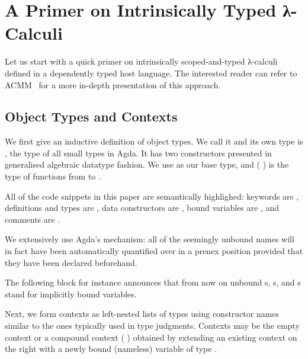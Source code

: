 \section{A Primer on Intrinsically Typed λ-Calculi}\label{sec:intrinsictyping}

Let us start with a quick primer on intrinsically scoped-and-typed λ-calculi
defined in a dependently typed host language. The interested reader
can refer to ACMM~\cite{DBLP:conf/cpp/Allais0MM17} for a more in-depth
presentation of this approach.

\subsection{Object Types and Contexts}

We first give an inductive definition of object types.
We call it  and its own type is ,
the type of all small types in Agda.
It has two constructors presented in generalised algebraic
datatype fashion.
We use  as our base type,
and (  ) is the type of functions from
 to .


\begin{remark}
  All of the code snippets in this paper are semantically highlighed:
  keywords are , definitions and types are ,
  data constructors are , bound variables are
  , and comments are .
\end{remark}

\begin{remark}
  We extensively use Agda's  mechanism: all of
  the seemingly unbound names will in fact have been automatically
  quantified over in a prenex position provided that they
  have been declared beforehand.
\end{remark}

The following block for instance announces that from now
on unbound s, s, and s stand for implicitly bound
 variables.


Next, we form contexts as left-nested lists of types using
constructor names similar to the ones typically used in
type judgments.
Contexts may be the empty context 
or a compound context ( \AIC{,} ) obtained
by extending an existing context  on the right
with a newly bound (nameless) variable of type .

